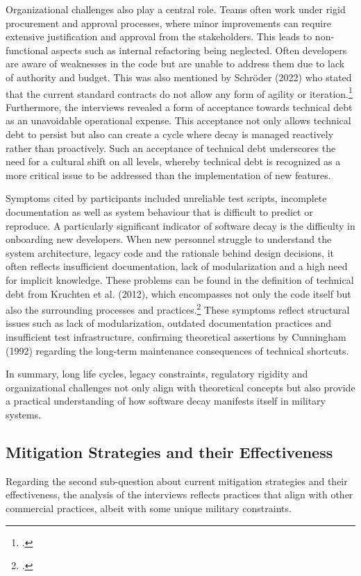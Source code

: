 Organizational challenges also play a central role. Teams often work under rigid procurement and approval processes, where minor improvements can require extensive justification and approval from the stakeholders. This leads to non-functional aspects such as internal refactoring being neglected.
Often developers are aware of weaknesses in the code but are unable to address them due to lack of authority and budget. This was also mentioned by Schröder (2022) who stated that the current standard contracts do not allow any form of agility or iteration.\footcite[no page number]{schroederUngeeignetFuerAgile2022}
Furthermore, the interviews revealed a form of acceptance towards technical debt as an unavoidable operational expense. This acceptance not only allows technical debt to persist but also can create a cycle where decay is managed reactively rather than proactively.
Such an acceptance of technical debt underscores the need for a cultural shift on all levels, whereby technical debt is recognized as a more critical issue to be addressed than the implementation of new features.

Symptoms cited by participants included unreliable test scripts, incomplete documentation as well as system behaviour that is difficult to predict or reproduce. A particularly significant indicator of software decay is the difficulty in onboarding new developers. When new personnel struggle to understand
the system architecture, legacy code and the rationale behind design decisions, it often reflects insufficient documentation, lack of modularization and a high need for implicit knowledge. These problems can be found in the  definition of technical debt from Kruchten et al. (2012), which encompasses not only the code itself but also the surrounding processes and practices.\footcite[19-20]{kruchtenTechnicalDebtMetaphor2012}
These symptoms reflect structural issues such as lack of modularization, outdated documentation practices and insufficient test infrastructure, confirming theoretical assertions by Cunningham (1992) regarding the long-term maintenance consequences of technical shortcuts.

In summary, long life cycles, legacy constraints, regulatory rigidity and organizational challenges not only align with theoretical concepts but also provide a practical understanding of how software decay manifests itself in military systems.

\subsection{Mitigation Strategies and their Effectiveness}
Regarding the second sub-question about current mitigation strategies and their effectiveness, the analysis of the interviews reflects practices that align with other commercial practices, albeit with some unique military constraints.


